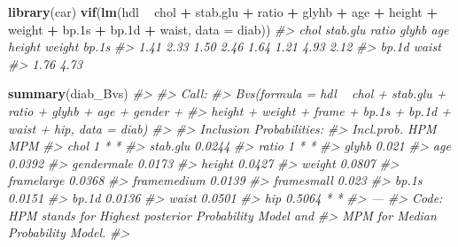 \documentclass[]{book}
\newenvironment{Shaded}{\begin{snugshade}}{\end{snugshade}}
\newcommand{\KeywordTok}[1]{\textcolor[rgb]{0.13,0.29,0.53}{\textbf{#1}}}
\newcommand{\DataTypeTok}[1]{\textcolor[rgb]{0.13,0.29,0.53}{#1}}
\newcommand{\StringTok}[1]{\textcolor[rgb]{0.31,0.60,0.02}{#1}}
\newcommand{\CommentTok}[1]{\textcolor[rgb]{0.56,0.35,0.01}{\textit{#1}}}
\newcommand{\OperatorTok}[1]{\textcolor[rgb]{0.81,0.36,0.00}{\textbf{#1}}}
\newcommand{\NormalTok}[1]{#1}
\begin{document}
\begin{Shaded}
\begin{Highlighting}[]
\KeywordTok{library}\NormalTok{(car)}
\KeywordTok{vif}\NormalTok{(}\KeywordTok{lm}\NormalTok{(hdl }\OperatorTok{~}\StringTok{ }\NormalTok{chol }\OperatorTok{+}\StringTok{ }\NormalTok{stab.glu }\OperatorTok{+}\StringTok{ }\NormalTok{ratio }\OperatorTok{+}\StringTok{ }\NormalTok{glyhb }\OperatorTok{+}\StringTok{ }\NormalTok{age }\OperatorTok{+}\StringTok{ }\NormalTok{height }\OperatorTok{+}\StringTok{ }\NormalTok{weight }\OperatorTok{+}\StringTok{  }\NormalTok{bp.1s }\OperatorTok{+}\StringTok{ }\NormalTok{bp.1d }\OperatorTok{+}\StringTok{ }\NormalTok{waist, }\DataTypeTok{data =}\NormalTok{ diab))}
\CommentTok{#>     chol stab.glu    ratio    glyhb      age   height   weight    bp.1s }
\CommentTok{#>     1.41     2.33     1.50     2.46     1.64     1.21     4.93     2.12 }
\CommentTok{#>    bp.1d    waist }
\CommentTok{#>     1.76     4.73}
\end{Highlighting}
\end{Shaded}

\begin{Shaded}
\begin{Highlighting}[]
\KeywordTok{summary}\NormalTok{(diab_Bvs)}
\CommentTok{#> }
\CommentTok{#> Call:}
\CommentTok{#> Bvs(formula = hdl ~ chol + stab.glu + ratio + glyhb + age + gender + }
\CommentTok{#>     height + weight + frame + bp.1s + bp.1d + waist + hip, data = diab)}
\CommentTok{#> }
\CommentTok{#> Inclusion Probabilities:}
\CommentTok{#>             Incl.prob. HPM MPM}
\CommentTok{#> chol                 1   *   *}
\CommentTok{#> stab.glu        0.0244        }
\CommentTok{#> ratio                1   *   *}
\CommentTok{#> glyhb            0.021        }
\CommentTok{#> age             0.0392        }
\CommentTok{#> gendermale      0.0173        }
\CommentTok{#> height          0.0427        }
\CommentTok{#> weight          0.0807        }
\CommentTok{#> framelarge      0.0368        }
\CommentTok{#> framemedium     0.0139        }
\CommentTok{#> framesmall       0.023        }
\CommentTok{#> bp.1s           0.0151        }
\CommentTok{#> bp.1d           0.0136        }
\CommentTok{#> waist           0.0501        }
\CommentTok{#> hip             0.5064   *   *}
\CommentTok{#> ---}
\CommentTok{#> Code: HPM stands for Highest posterior Probability Model and}
\CommentTok{#>  MPM for Median Probability Model.}
\CommentTok{#> }
\end{Highlighting}
\end{Shaded}
\end{document}

